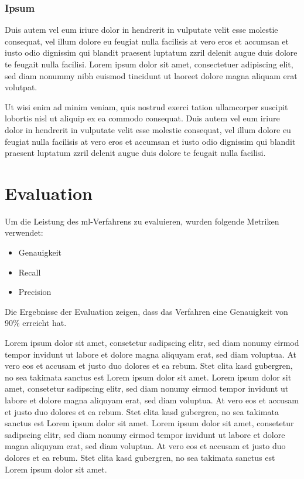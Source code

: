 \documentclass[9pt,a4paper,ngerman]{extarticle}
\begin{document}
\section{Ipsum}
Duis autem vel eum iriure dolor in hendrerit in vulputate velit esse molestie consequat, vel illum dolore eu feugiat nulla facilisis at vero eros et accumsan et iusto odio dignissim qui blandit praesent luptatum zzril delenit augue duis dolore te feugait nulla facilisi. Lorem ipsum dolor sit amet, consectetuer adipiscing elit, sed diam nonummy nibh euismod tincidunt ut laoreet dolore magna aliquam erat volutpat.   

Ut wisi enim ad minim veniam, quis nostrud exerci tation ullamcorper suscipit lobortis nisl ut aliquip ex ea commodo consequat. Duis autem vel eum iriure dolor in hendrerit in vulputate velit esse molestie consequat, vel illum dolore eu feugiat nulla facilisis at vero eros et accumsan et iusto odio dignissim qui blandit praesent luptatum zzril delenit augue duis dolore te feugait nulla facilisi. 

\clearpage

\part{Evaluation}\label{sec:evaluation}
Um die Leistung des \gls{ml}-Verfahrens zu evaluieren, wurden folgende Metriken verwendet:

\begin{itemize}
    \item Genauigkeit
    \item Recall
    \item Precision
\end{itemize}

Die Ergebnisse der Evaluation zeigen, dass das Verfahren eine Genauigkeit von 90\% erreicht hat.\cite{smith2023}

Lorem ipsum dolor sit amet, consetetur sadipscing elitr, sed diam nonumy eirmod tempor invidunt ut labore et dolore magna aliquyam erat, sed diam voluptua. At vero eos et accusam et justo duo dolores et ea rebum. Stet clita kasd gubergren, no sea takimata sanctus est Lorem ipsum dolor sit amet. Lorem ipsum dolor sit amet, consetetur sadipscing elitr, sed diam nonumy eirmod tempor invidunt ut labore et dolore magna aliquyam erat, sed diam voluptua. At vero eos et accusam et justo duo dolores et ea rebum. Stet clita kasd gubergren, no sea takimata sanctus est Lorem ipsum dolor sit amet. Lorem ipsum dolor sit amet, consetetur sadipscing elitr, sed diam nonumy eirmod tempor invidunt ut labore et dolore magna aliquyam erat, sed diam voluptua. At vero eos et accusam et justo duo dolores et ea rebum. Stet clita kasd gubergren, no sea takimata sanctus est Lorem ipsum dolor sit amet.\cite{wilson2026}
\end{document}
